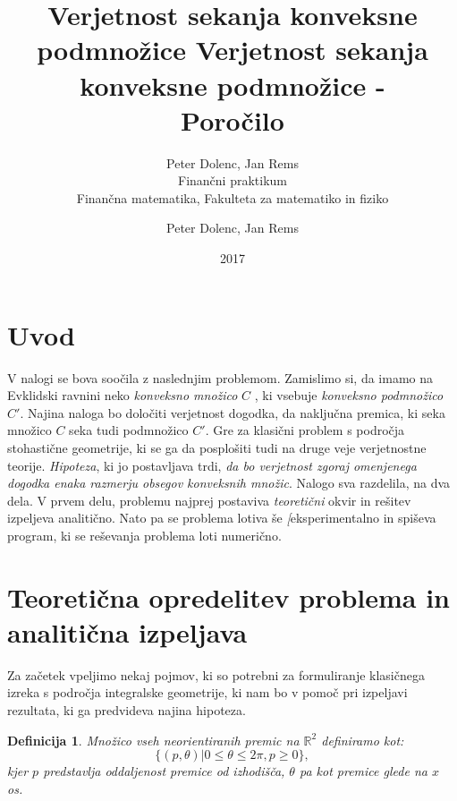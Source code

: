 \documentclass[a4paper]{article}
\title{Verjetnost sekanja konveksne podmnožice}
\author{Peter Dolenc, Jan Rems \\ Finančni praktikum \\ Finančna matematika, Fakulteta za matematiko in fiziko}
\date{2017}
\newtheorem{definicija}{Definicija}
\begin{document}
\title{%
  Verjetnost sekanja konveksne podmnožice -\\
   \large Poročilo \\}

\author{Peter Dolenc, Jan Rems}

\maketitle
\thispagestyle{empty}
\pagebreak
\clearpage
\tableofcontents
\thispagestyle{empty}
\pagebreak
\clearpage
\setcounter{page}{1}
\section{Uvod}


V nalogi se bova soočila z naslednjim problemom. Zamislimo si, da imamo na Evklidski ravnini neko \textit{konveksno množico} $C$ , ki vsebuje \textit{konveksno podmnožico } $C'$. Najina naloga bo določiti verjetnost dogodka, da naključna premica, ki seka množico $C$ seka tudi podmnožico $C'$. Gre za klasični problem s področja stohastične geometrije, ki se ga da posplošiti tudi na druge veje verjetnostne teorije. \textit{Hipoteza}, ki jo postavljava trdi, \textit{da bo verjetnost zgoraj omenjenega dogodka enaka razmerju obsegov konveksnih množic}. Nalogo sva razdelila, na dva dela. V prvem delu, problemu najprej postaviva \textit{teoretični}  okvir in rešitev izpeljeva analitično. Nato pa se problema lotiva še \textit[{eksperimentalno} in spiševa program, ki se reševanja problema loti numerično.


\vspace{4 mm}


\section{Teoretična opredelitev problema in analitična izpeljava}

Za začetek vpeljimo nekaj pojmov, ki so potrebni za formuliranje klasičnega izreka s področja integralske geometrije, ki nam bo v pomoč pri izpeljavi rezultata, ki ga predvideva najina hipoteza.

\begin{definicija}\label{def:1}
Množico vseh neorientiranih premic na $\mathbb{R}^2$ definiramo kot: $$ \{ (p,\theta)|0 \le \theta \le 2 \pi , p \ge 0\},$$ kjer $p$ predstavlja oddaljenost premice od izhodišča, $\theta$ pa kot premice glede na $x$ os.
\end{definicija}
\end{document}
